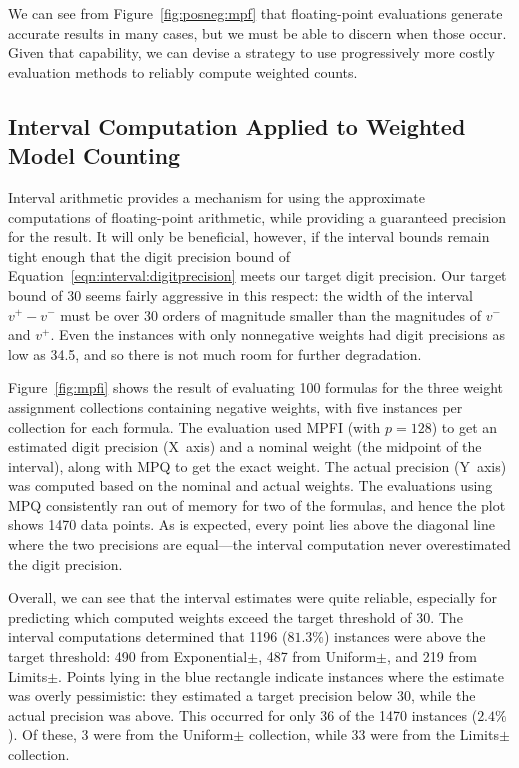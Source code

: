 \documentclass[letterpaper,USenglish,cleveref, autoref, thm-restate]{lipics-v2021}
\newcommand{\vmin}{v^{-}}
\newcommand{\vmax}{v^{+}}
\begin{document}
We can see from Figure~\ref{fig:posneg:mpf} that floating-point
evaluations generate accurate results in many cases, but we must be
able to discern when those occur.  Given that capability, we can
devise a strategy to use progressively more costly evaluation methods
to reliably compute weighted counts.

\subsection{Interval Computation Applied to Weighted Model Counting}

Interval arithmetic provides a mechanism for using the approximate
computations of floating-point arithmetic, while providing a
guaranteed precision for the result.  It will only be beneficial,
however, if the interval bounds remain tight enough that the digit
precision bound of Equation~\ref{eqn:interval:digitprecision} meets
our target digit precision.  Our target bound of 30 seems fairly
aggressive in this respect: the width of the interval $\vmax-\vmin$
must be over 30 orders of magnitude smaller than the magnitudes of
$\vmin$ and $\vmax$.  Even the instances with only nonnegative weights
had digit precisions as low as 34.5, and so there is not much
room for further degradation.

Figure~\ref{fig:mpfi} shows the result of evaluating 100 formulas for
the three weight assignment collections containing negative weights,
with five instances per collection for each formula.  
The evaluation used
MPFI (with $p=128$) to get an estimated digit precision (X~axis) and
a nominal weight (the midpoint of the interval), along with MPQ to get
the exact weight.  The actual precision (Y~axis) was computed based on the
nominal and actual weights.  The evaluations using MPQ consistently ran out of
memory for two of the formulas, and hence the plot shows 1470
data points.  
As is expected, every point lies above the diagonal line where the two precisions are equal---the interval computation never overestimated the digit
precision.


Overall, we can see that the interval estimates were quite reliable,
especially for predicting which computed weights exceed the target
threshold of 30.
The
interval computations determined that 1196 ($81.3\%$) instances were
above the target threshold: 490 from \textsf{Exponential$\pm$}, 487 from
\textsf{Uniform$\pm$}, and 219 from \textsf{Limits$\pm$}.
Points lying in the blue rectangle
indicate instances where the estimate was overly pessimistic: they
estimated a target precision below 30, while the actual precision was
above.  This occurred for only 36 of the 1470 instances ($2.4\%$).  Of
these, 3 were from the \textsf{Uniform$\pm$} collection, while 33 were
from the \textsf{Limits$\pm$} collection.  
\end{document}
